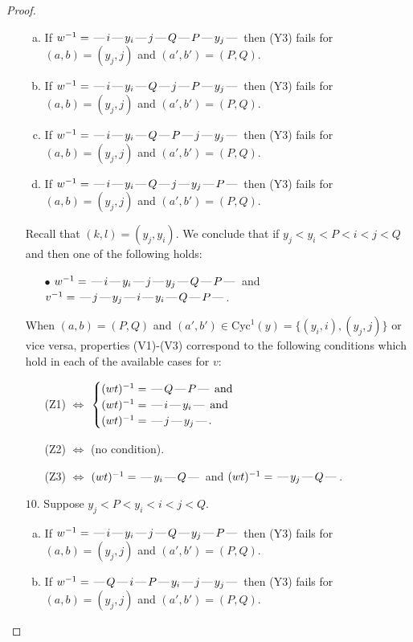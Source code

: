 \documentclass[10pt]{article}
\theoremstyle{definition}
\theoremstyle{definition}
\def\dash{\text{\hspace{0.5mm}---\hspace{0.5mm}}}
\def\Cyc{\mathrm{Cyc}}
\begin{document}
\begin{proof}
\begin{enumerate}
\begin{enumerate}[(a)]
\item If $w^{-1} = \dash i\dash y_i\dash j\dash Q\dash P\dash y_j\dash $ then (Y3) fails for $(a,b)=(y_j,j)$ and $(a',b')=(P,Q)$.
\item If $w^{-1} = \dash i\dash y_i\dash Q\dash j\dash P\dash y_j\dash $ then (Y3) fails for $(a,b)=(y_j,j)$ and $(a',b')=(P,Q)$.
\item If $w^{-1} = \dash i\dash y_i\dash Q\dash P\dash j\dash y_j\dash $ then (Y3) fails for $(a,b)=(y_j,j)$ and $(a',b')=(P,Q)$.
\item If $w^{-1} = \dash i\dash y_i\dash Q\dash j\dash y_j\dash P\dash $ then (Y3) fails for $(a,b)=(y_j,j)$ and $(a',b')=(P,Q)$.
\end{enumerate}
Recall that $(k,l) = (y_j,y_i)$.
We conclude that if $y_j < y_i < P < i < j < Q$ and then one of the following holds:
\begin{enumerate}
\item[$\bullet$] $w^{-1} = \dash i\dash y_i\dash j\dash y_j\dash Q\dash P\dash $ and $v^{-1} = \dash j\dash y_j\dash i\dash y_i\dash Q\dash P\dash $.
\end{enumerate}
When $(a,b)= (P,Q)$ and $(a',b')\in \Cyc^1(y)=\{(y_i,i),(y_j,j)\}$ or vice versa,
properties (V1)-(V3) correspond to the following conditions which hold in
each of the available cases for $v$:
\begin{enumerate}
\item[](Z1) $\Leftrightarrow$ $\begin{cases}\text{$(wt)^{-1} = \dash Q \dash P \dash$}\text{ and }\\
\text{$(wt)^{-1} = \dash i \dash y_i \dash$}\text{ and }\\
\text{$(wt)^{-1} = \dash j \dash y_j \dash$}.\end{cases}$
\item[](Z2) $\Leftrightarrow$ (no condition).
\item[](Z3) $\Leftrightarrow$ $(wt)^{-1} = \dash y_i \dash Q \dash$  and $(wt)^{-1} = \dash y_j \dash Q \dash$.
\end{enumerate}
\item[$10$.] Suppose $y_j < P < y_i < i < j < Q$.
\begin{enumerate}[(a)]
\item If $w^{-1} = \dash i\dash y_i\dash j\dash Q\dash y_j\dash P\dash $ then (Y3) fails for $(a,b)=(y_j,j)$ and $(a',b')=(P,Q)$.
\item If $w^{-1} = \dash Q\dash i\dash P\dash y_i\dash j\dash y_j\dash $ then (Y3) fails for $(a,b)=(y_j,j)$ and $(a',b')=(P,Q)$.

\end{enumerate}
\end{enumerate}
\end{proof}
\end{document}
